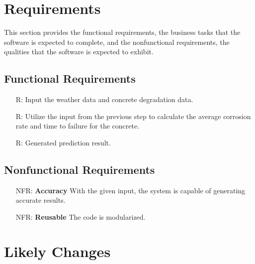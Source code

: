 \documentclass[12pt]{article}
\newcounter{reqnum} %
\newcounter{nfrnum} %
\begin{document}
\section{Requirements}

This section provides the functional requirements, the business tasks that the
software is expected to complete, and the nonfunctional requirements, the
qualities that the software is expected to exhibit.

\subsection{Functional Requirements}

\noindent \begin{itemize}

\item[R\refstepcounter{reqnum}\thereqnum \label{R_Inputs}:] Input the weather data and concrete degradation data.

\item[R\refstepcounter{reqnum}\thereqnum \label{R_OutputInputs}:] Utilize the input from the previous step to calculate the average corrosion rate and time to failure for the concrete.

\item[R\refstepcounter{reqnum}\thereqnum \label{R_Calculate}:] Generated prediction result.

\end{itemize}

\subsection{Nonfunctional Requirements}

\noindent \begin{itemize}

\item[NFR\refstepcounter{nfrnum}\thenfrnum \label{NFR_Accuracy}:]
  \textbf{Accuracy} With the given input, the system is capable of generating accurate results.

\item[NFR\refstepcounter{nfrnum}\thenfrnum \label{NFR_Verifiable}:] \textbf{Reusable} The code is modularized.

\end{itemize}

\section{Likely Changes}    
\end{document}
